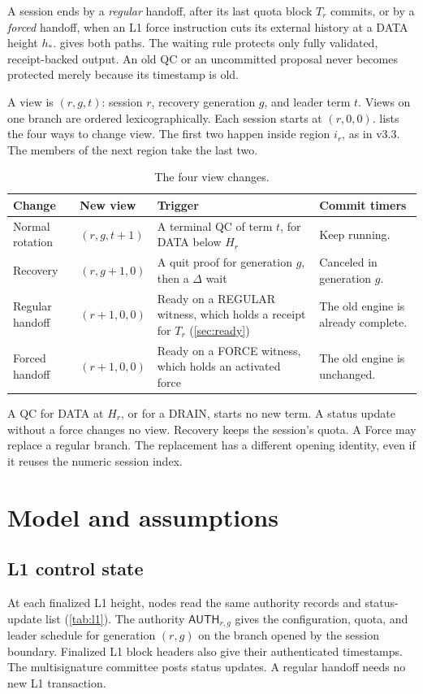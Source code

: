 \documentclass[11pt,a4paper]{article}
\newcommand{\tagg}[1]{\ensuremath{\mathsf{#1}}}
\begin{document}
A session ends by a \emph{regular} handoff, after its last quota block
$T_r$ commits, or by a \emph{forced} handoff, when an L1 force
instruction cuts its external history at a DATA height $h_*$.
 gives both paths. The waiting rule protects only
fully validated, receipt-backed output. An old QC or an uncommitted
proposal never becomes protected merely because its timestamp is old.

A view is $(r,g,t)$: session $r$, recovery generation $g$, and leader
term $t$. Views on one branch are ordered lexicographically. Each session starts at
$(r,0,0)$.  lists the four ways to change view. The
first two happen inside region $i_r$, as in v3.3. The members of the
next region take the last two.

\begin{table}[htbp]\centering\small
\caption{The four view changes.}
\label{tab:views}
\begin{tabularx}{\linewidth}{@{}>{\raggedright\arraybackslash}p{.19\linewidth}>{\raggedright\arraybackslash}p{.12\linewidth}Y>{\raggedright\arraybackslash}p{.23\linewidth}@{}}
\toprule
Change & New view & Trigger & Commit timers\\
\midrule
Normal rotation & $(r,g,t+1)$ & A terminal QC of term $t$, for DATA below $H_r$ & Keep running.\\
Recovery & $(r,g+1,0)$ & A quit proof for generation $g$, then a $\Delta$ wait & Canceled in generation $g$.\\
Regular handoff & $(r+1,0,0)$ & Ready on a REGULAR witness, which holds a receipt for $T_r$ (\cref{sec:ready}) & The old engine is already complete.\\
Forced handoff & $(r+1,0,0)$ & Ready on a FORCE witness, which holds an activated force & The old engine is unchanged.\\
\bottomrule
\end{tabularx}
\end{table}
A QC for DATA at $H_r$, or for a DRAIN, starts no new term. A status
update without a force changes no view. Recovery keeps the session's
quota. A Force may replace a regular branch. The replacement has a
different opening identity, even if it reuses the numeric session index.

\section{Model and assumptions}
\label{sec:model}

\subsection{L1 control state}
\label{sec:l1}
At each finalized L1 height, nodes read the same authority records and
status-update list (\cref{tab:l1}). The authority
$\tagg{AUTH}_{r,g}$ gives the configuration, quota, and leader schedule
for generation $(r,g)$ on the branch opened by the session boundary.
Finalized L1 block headers also give their authenticated timestamps.
The multisignature committee posts status updates. A regular handoff
needs no new L1 transaction.
\end{document}
